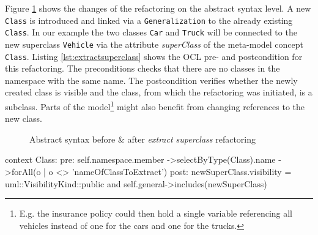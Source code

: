 \documentclass{llncs}
\begin{document}
Figure \ref{fig:extract} shows the changes of the refactoring on the abstract syntax level. A new \texttt{Class} is 
introduced and linked via a \texttt{Generalization} to the already existing \texttt{Class}. In our example the two 
classes \texttt{Car} and \texttt{Truck} will be connected to the new superclass \texttt{Vehicle} via the attribute 
\textit{superClass} of the meta-model concept \texttt{Class}. Listing \ref{lst:extractsuperclass} shows the OCL pre- and 
postcondition for this refactoring. The preconditions checks that there are no classes in the namespace with the 
same name. The postcondition verifies whether the newly created class is visible and the class, from which the refactoring was initiated,
is a subclass. Parts of the model\footnote{E.g. the insurance policy could then hold a single variable referencing all vehicles instead 
of one for the cars and one for the trucks.} might also benefit from changing references to the new class.

\begin{figure}
 \label{fig:extract}
 \caption{Abstract syntax before \& after \textit{extract superclass} refactoring}
\end{figure}

\begin{lstsingle}[language=OCL,caption=OCL for \textit{extract superclass} refactoring,label=lst:extractsuperclass]
context Class:
pre:  self.namespace.member
        ->selectByType(Class).name
        ->forAll(o | o <> 'nameOfClassToExtract')
post: newSuperClass.visibility = uml::VisibilityKind::public
      and 
      self.general->includes(newSuperClass)
\end{lstsingle}
\end{document}
